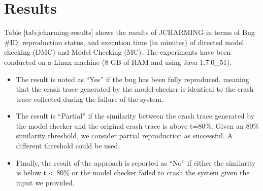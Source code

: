 \section{Results}\label{results}

Table {[}tab:jcharming-results{]} shows the results of JCHARMING in
terms of Bug \#ID, reproduction status, and execution time (in minutes)
of directed model checking (DMC) and Model Checking (MC). The
experiments have been conducted on a Linux machine (8 GB of RAM and
using Java 1.7.0\_51).

\begin{itemize}
\item
  The result is noted as ``Yes'' if the bug has been fully reproduced,
  meaning that the crash trace generated by the model checker is
  identical to the crash trace collected during the failure of the
  system.
\item
  The result is ``Partial'' if the similarity between the crash trace
  generated by the model checker and the original crash trace is above
  t=80\%. Given an 80\% similarity threshold, we consider partial
  reproduction as successful. A different threshold could be used.
\item
  Finally, the result of the approach is reported as ``No'' if either
  the similarity is below t \textless{} 80\% or the model checker failed
  to crash the system given the input we provided.
\end{itemize}

